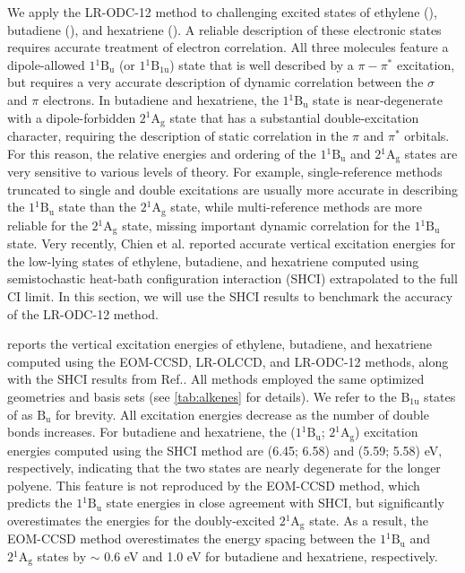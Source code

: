 We apply the LR-ODC-12 method to challenging excited states of ethylene
(), butadiene (), and hexatriene ().  A reliable
description of these electronic states requires accurate treatment of electron
correlation.\cite{%
    Tavan:1986p6602, Tavan:1987p4337, Nakayama:1998p157,
    Davidson:1996p6161, Watts:1998p6979, Muller:1999p7176, Li:1999p177,
    Starcke:2006p39, Kurashige:2004p425, Ghosh:2008p144117, Sokolov:2017p244102,
    Schreiber:2008p134110, Zgid:2009p194107, Angeli:2010p2436, Daday:2012p4441,
    Watson:2012p4013, Zimmerman:2017p4712%
}
All three molecules feature a dipole-allowed $1{}^1\mathrm{B_{u}}$ (or
$1{}^1\mathrm{B_{1u}}$) state that is well described by a $\pi-\pi^*$
excitation, but requires a very accurate description of dynamic correlation
between the $\sigma$ and $\pi$ electrons.
In butadiene and hexatriene, the $1{}^1\mathrm{B_{u}}$ state is near-degenerate
with a dipole-forbidden $2{}^1\mathrm{A_{g}}$ state that has a substantial
double-excitation character, requiring the description of static correlation in
the $\pi$ and $\pi^*$
orbitals.\cite{Kurashige:2004p425,Ghosh:2008p144117,Sokolov:2017p244102}
For this reason, the relative energies and ordering of the $1{}^1\mathrm{B_{u}}$
and $2{}^1\mathrm{A_{g}}$ states are very sensitive to various levels of theory.
For example, single-reference methods truncated to single and double excitations
are usually more accurate in describing the $1{}^1\mathrm{B_{u}}$ state than the
$2{}^1\mathrm{A_{g}}$ state, while multi-reference methods are more reliable for
the $2{}^1\mathrm{A_{g}}$ state, missing important dynamic correlation for the
$1{}^1\mathrm{B_{u}}$ state.
Very recently, Chien et al.\cite{Chien:2018p2714} reported accurate vertical
excitation energies for the low-lying states of ethylene, butadiene, and
hexatriene computed using semistochastic heat-bath configuration interaction
(SHCI) extrapolated to the full CI limit.
In this section, we will use the SHCI results to benchmark the accuracy of the
LR-ODC-12 method.

 reports the vertical excitation energies of ethylene,
butadiene, and hexatriene computed using the EOM-CCSD, LR-OLCCD, and LR-ODC-12
methods, along with the SHCI results from Ref.\@ {}.
All methods employed the same optimized geometries and basis sets (see
\cref{tab:alkenes} for details).
We refer to the $\mathrm{B_{1u}}$ states of  as $\mathrm{B_{u}}$ for
brevity.
All excitation energies decrease as the number of double bonds increases.
For butadiene and hexatriene, the ($1{}^1\mathrm{B_{u}}$; $2{}^1\mathrm{A_{g}}$)
excitation energies computed using the SHCI method are (6.45; 6.58) and (5.59;
5.58) eV, respectively, indicating that the two states are nearly degenerate for
the longer polyene.
This feature is not reproduced by the EOM-CCSD method, which predicts the
$1{}^1\mathrm{B_{u}}$ state energies in close agreement with SHCI, but
significantly overestimates the energies for the doubly-excited
$2{}^1\mathrm{A_{g}}$ state.
As a result, the EOM-CCSD method overestimates the energy spacing between the
$1{}^1\mathrm{B_{u}}$ and $2{}^1\mathrm{A_{g}}$ states by $\sim$ 0.6 eV and 1.0
eV for butadiene and hexatriene, respectively. 

